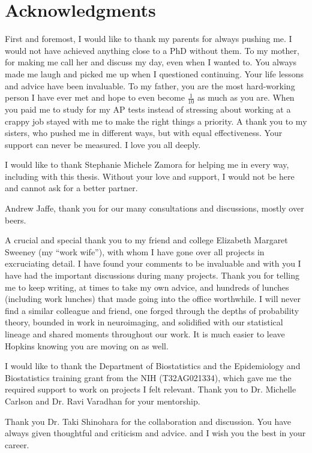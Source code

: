 \chapter{Acknowledgments}

First and foremost, I would like to thank my parents for always pushing me.  I would not have achieved anything close to a PhD without them.  To my mother, for making me call her and discuss my day, even when I wanted to.  You always made me laugh and picked me up when I questioned continuing. Your life lessons and advice have been invaluable. To my father, you are the most hard-working person I have ever met and hope to even become $\frac{1}{10}$ as much as you are.  When you paid me to study for my AP tests instead of stressing about working at a crappy job stayed with me to make the right things a priority.  A thank you to my sisters, who pushed me in different ways, but with equal effectiveness.  Your support can never be measured.  I love you all deeply. 

I would like to thank Stephanie Michele Zamora for helping me in every way, including with this thesis.  Without your love and support, I would not be here and cannot ask for a better partner.

Andrew Jaffe, thank you for our many consultations and discussions, mostly over beers.

A crucial and special thank you to my friend and college Elizabeth Margaret Sweeney (my ``work wife''), with whom I have gone over all projects in excruciating detail.  I have found your comments to be invaluable and with you I have had the important discussions during many projects.  Thank you for telling me to keep writing, at times to take my own advice, and hundreds of lunches (including work lunches) that made going into the office worthwhile.  I will never find a similar colleague and friend, one forged through the depths of probability theory, bounded in work in neuroimaging, and solidified with our statistical lineage and shared moments throughout our work.  It is much easier to leave Hopkins knowing you are moving on as well.

I would like to thank the Department of Biostatistics and the Epidemiology and Biostatistics training grant from the NIH (T32AG021334), which gave me the required support to work on projects I felt relevant.  Thank you to Dr. Michelle Carlson and Dr. Ravi Varadhan for your mentorship.  

Thank you Dr. Taki Shinohara for the collaboration and discussion.  You have always given thoughtful and criticism and advice. and I wish you the best in your career. 

